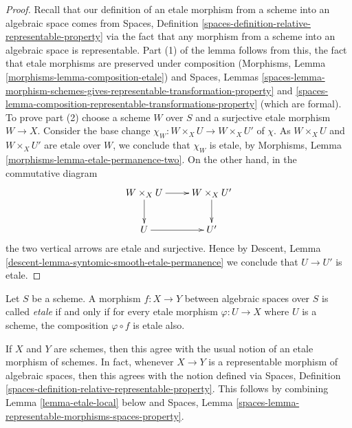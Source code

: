 \begin{proof}
Recall that our definition of an etale morphism from a scheme into an
algebraic space comes from
Spaces, Definition \ref{spaces-definition-relative-representable-property}
via the fact that any morphism from a scheme into an algebraic space
is representable. Part (1) of the lemma follows from this, the fact that
etale morphisms are preserved under composition
(Morphisms, Lemma \ref{morphisms-lemma-composition-etale})
and
Spaces, Lemmas
\ref{spaces-lemma-morphism-schemes-gives-representable-transformation-property}
and
\ref{spaces-lemma-composition-representable-transformations-property}
(which are formal).
To prove part (2) choose a scheme $W$ over $S$ and a
surjective etale morphism $W \to X$. Consider the base change
$\chi_W : W \times_X U \to W \times_X U'$ of $\chi$.
As $W \times_X U$ and $W \times_X U'$ are etale over $W$, we conclude that
$\chi_W$ is etale, by
Morphisms, Lemma \ref{morphisms-lemma-etale-permanence-two}.
On the other hand, in the commutative diagram
$$
\xymatrix{
W \times_X U \ar[r] \ar[d] & W \times_X U' \ar[d] \\
U \ar[r] & U'
}
$$
the two vertical arrows are etale and surjective.
Hence by
Descent, Lemma \ref{descent-lemma-syntomic-smooth-etale-permanence}
we conclude that $U \to U'$ is etale.
\end{proof}

\begin{definition}
\label{definition-etale}
Let $S$ be a scheme.
A morphism $f : X \to Y$ between algebraic spaces over $S$ is
called {\it etale} if and only if for every etale morphism
$\varphi : U \to X$ where $U$ is a scheme, the composition
$\varphi \circ f$ is etale also.
\end{definition}

\noindent
If $X$ and $Y$ are schemes, then this agree with the usual notion of an
etale morphism of schemes. In fact, whenever $X \to Y$ is a representable
morphism of algebraic spaces, then this agrees with the notion defined via
Spaces, Definition \ref{spaces-definition-relative-representable-property}.
This follows by combining Lemma \ref{lemma-etale-local} below and
Spaces, Lemma \ref{spaces-lemma-representable-morphisms-spaces-property}.

